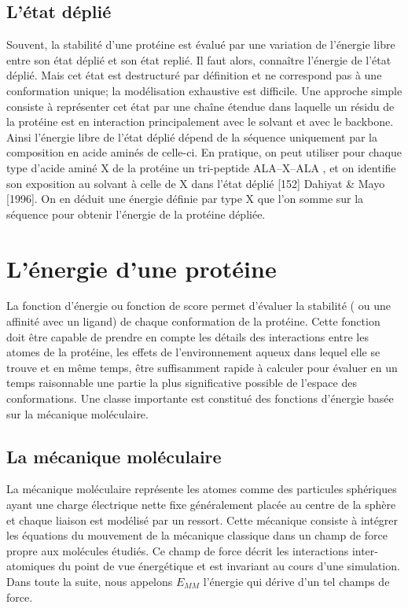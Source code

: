 \subsection{L'état déplié }
Souvent, la stabilité d'une protéine est évalué par une variation de l'énergie libre entre son état déplié et son état replié. Il faut alors, connaître l'énergie de l'état déplié. Mais cet état est destructuré par définition et ne correspond pas à une conformation unique; la modélisation exhaustive est difficile. Une approche simple consiste à représenter cet état par une chaîne étendue dans laquelle un résidu de la protéine est en interaction principalement avec le solvant et avec le backbone. Ainsi l'énergie libre de l'état déplié dépend de la séquence uniquement par la composition en acide aminés de celle-ci. En pratique, on peut utiliser pour chaque type d'acide aminé X de la protéine  un tri-peptide ALA--X--ALA , et on identifie son exposition au solvant à celle de X dans l'état déplié [152] Dahiyat & Mayo [1996]. On en déduit une énergie définie par type X que l'on somme sur la séquence pour obtenir l'énergie de la protéine dépliée. 

\section{L'énergie d'une protéine}

La fonction d'énergie ou fonction de score permet d'évaluer la stabilité ( ou une affinité avec un ligand) de chaque conformation de la protéine. Cette fonction doit être capable de prendre en compte les détails des interactions entre les atomes de la protéine, les effets de l'environnement aqueux  dans lequel elle se trouve et en même temps, être suffisamment rapide à calculer pour évaluer en un temps raisonnable une partie la plus significative possible de l'espace des conformations. Une classe importante est constitué des fonctions d'énergie basée sur la mécanique moléculaire.

\subsection{La mécanique moléculaire}
\label{sub:mecamol}
La mécanique moléculaire représente les atomes comme des particules sphériques ayant une charge électrique nette fixe généralement placée au centre de la sphère et chaque liaison est modélisé par un ressort.
Cette mécanique consiste à intégrer les équations du mouvement de la mécanique classique dans un champ de force propre aux molécules étudiés. Ce champ de force décrit les interactions inter-atomiques du point de vue énergétique et est invariant au cours d'une simulation.
Dans toute la suite, nous appelons $E_{MM}$ l'énergie qui dérive d'un tel champs de force.

